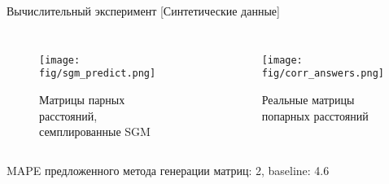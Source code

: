 \documentclass{beamer}
\begin{document}
\begin{frame}{Вычислительный эксперимент [Синтетические данные]}


\begin{columns}[c]
   \begin{figure}
\centering
\texttt{[image: fig/sgm\_predict.png]}
\caption{Матрицы парных расстояний, семплированные SGM}
\label{fig:fig22}
   \end{figure}
   
   
    \begin{figure}
	\centering
	\texttt{[image: fig/corr\_answers.png]}
	\caption{Реальные матрицы попарных расстояний}
	\label{fig:fig23}
    \end{figure}
  \end{columns}

MAPE предложенного метода генерации матриц: 2, baseline: 4.6



 \end{frame}
 




\end{document}
